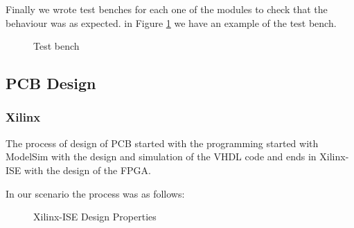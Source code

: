 \documentclass[12pt]{article}
\begin{document}
Finally we wrote test benches for each one of the modules to check that the behaviour was as expected. in Figure \ref{fig:tb1} we have an example of the test bench.

\begin{figure}[H]
\caption{Test bench}
\label{fig:tb1}
\end{figure}

\subsection{PCB Design}

\subsubsection{Xilinx}

The process of design of PCB started with the programming started with ModelSim with the design and simulation of the VHDL code and ends in Xilinx-ISE with the design of the FPGA. 

In our scenario the process was as follows:

  
\begin{figure}[!h]
\caption{Xilinx-ISE Design Properties}
\label{fig:xil1}
\end{figure}
\end{document}
